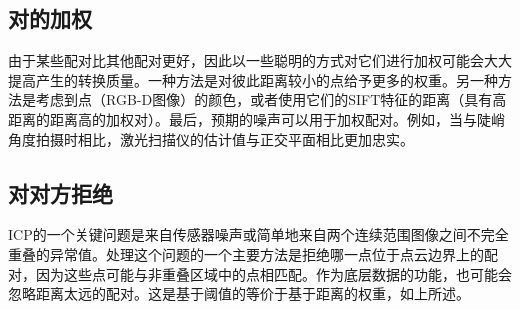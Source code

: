 
\subsection {对的加权}
由于某些配对比其他配对更好，因此以一些聪明的方式对它们进行加权可能会大大提高产生的转换质量。一种方法是对彼此距离较小的点给予更多的权重。另一种方法是考虑到点（RGB-D图像）的颜色，或者使用它们的SIFT特征的距离（具有高距离的距离高的加权对）。最后，预期的噪声可以用于加权配对。例如，当与陡峭角度拍摄时相比，激光扫描仪的估计值与正交平面相比更加忠实。


\subsection{对对方拒绝}
ICP的一个关键问题是来自传感器噪声或简单地来自两个连续范围图像之间不完全重叠的异常值。处理这个问题的一个主要方法是拒绝哪一点位于点云边界上的配对，因为这些点可能与非重叠区域中的点相匹配。作为底层数据的功能，也可能会忽略距离太远的配对。这是基于阈值的等价于基于距离的权重，如上所述。

